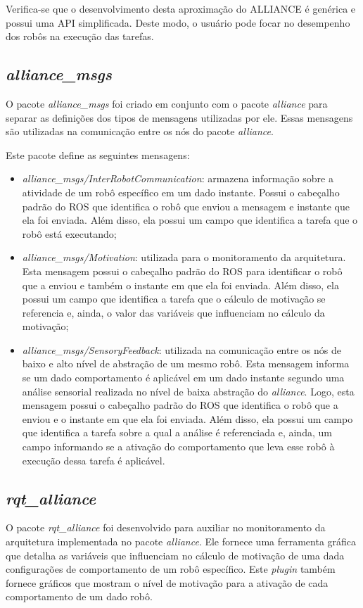             Verifica-se que o desenvolvimento desta aproximação do ALLIANCE é genérica e possui uma API simplificada. Deste modo, o usuário pode focar no desempenho dos robôs na execução das tarefas.
        
        \subsection{\textit{alliance\_msgs}}
            O pacote \textit{alliance\_msgs} foi criado em conjunto com o pacote \textit{alliance} para separar as definições dos tipos de mensagens utilizadas por ele. Essas mensagens são utilizadas na comunicação entre os nós do pacote \textit{alliance}.
            
            Este pacote define as seguintes mensagens:
            
            \begin{itemize}
                \item \textit{alliance\_msgs/InterRobotCommunication}: armazena informação sobre a atividade de um robô específico em um dado instante. Possui o cabeçalho padrão do ROS que identifica o robô que enviou a mensagem e instante que ela foi enviada. Além disso, ela possui um campo que identifica a tarefa que o robô está executando;
                \item \textit{alliance\_msgs/Motivation}: utilizada para o monitoramento da arquitetura. Esta mensagem possui o cabeçalho padrão do ROS para identificar o robô que a enviou e também o instante em que ela foi enviada. Além disso, ela possui um campo que identifica a tarefa que o cálculo de motivação se referencia e, ainda, o valor das variáveis que influenciam no cálculo da motivação;
                \item \textit{alliance\_msgs/SensoryFeedback}: utilizada na comunicação entre os nós de baixo e alto nível de abstração de um mesmo robô. Esta mensagem informa se um dado comportamento é aplicável em um dado instante segundo uma análise sensorial realizada no nível de baixa abstração do \textit{alliance}. Logo, esta mensagem possui o cabeçalho padrão do ROS que identifica o robô que a enviou e o instante em que ela foi enviada. Além disso, ela possui um campo que identifica a tarefa sobre a qual a análise é referenciada e, ainda, um campo informando se a ativação do comportamento que leva esse robô à execução dessa tarefa é aplicável.
            \end{itemize}
        
        \subsection{\textit{rqt\_alliance}}
            O pacote \textit{rqt\_alliance} foi desenvolvido para auxiliar no monitoramento da arquitetura implementada no pacote \textit{alliance}. Ele fornece uma ferramenta gráfica que detalha as variáveis que influenciam no cálculo de motivação de uma dada configurações de comportamento de um robô específico. Este \textit{plugin} também fornece gráficos que mostram o nível de motivação para a ativação de cada comportamento de um dado robô.
            
